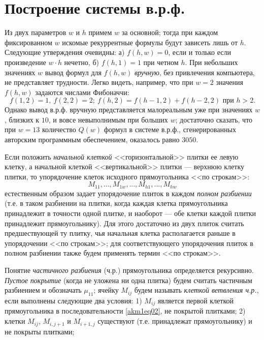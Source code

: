 \section{Построение системы в.р.ф.}

Из двух параметров $w$ и $h$ примем $w$ за основной; тогда при каждом фиксированном $w$ искомые рекуррентные формулы будут зависеть лишь от $h$.
Следующие утверждения очевидны: а) $f(h,w)=0$, если и только если произведение $w\cdot h$ нечетно, б) $f(h,1)=1$ при четном $h$. При небольших значениях $w$ вывод формул для $f(h,w)$ \textit{ вручную}, без привлечения компьютера, не представляет трудности. Легко видеть, например, что при $w=2$ значения $f(h,w)$ задаются числами Фибоначчи:
$$
f(1,2)=1,\ f(2,2)=2;\ f(h,2)=f(h-1,2)+f(h-2,2) \text { при }  h>2.
$$
%
Однако вывод в.р.ф. вручную представляется малореальным уже при значениях $w$, близких к $10$, и вовсе невыполнимым при больших $w$; достаточно сказать, что при ${w=13}$ количество $Q(w)$ формул в системе в.р.ф., сгенерированных авторским программным обеспечением, оказалось равно $3050$.

Если положить \textit{ начальной клеткой} <<горизонтальной>> плитки ее левую клетку, а начальной клеткой <<вертикальной>> плитки --– верхнюю клетку плитки, то упорядочение клеток исходного прямоугольника <<по строкам>>:
\begin{equation}\label{akm1eq02}
M_{11}, ..., M_{1w}, ..., M_{h1},..., M_{hw}
\end{equation}
естественным образом задает упорядочение плиток в каждом \textit{ полном разбиении} (т.е. в таком разбиении на плитки, когда каждая клетка прямоугольника принадлежит в точности одной плитке, и наоборот --- обе клетки каждой плитки принадлежит прямоугольнику). Для этого достаточно из двух плиток считать предшествующей ту плитку, чья начальная клетка располагается раньше в упорядочении <<по строкам>>; для соответствующего упорядочения плиток в полном разбиении также будем применять термин <<по строкам>>.

Понятие \textit{ частичного разбиения} (ч.р.) прямоугольника определяется рекурсивно. \textit{ Пустое покрытие} (когда не уложена ни одна плитка) будем считать частичным разбиением и обозначать $\mu_{11}$;
ячейку $M_{ij}$ будем называть \textit{ клеткой ветвления ч.р.}, если выполнены следующие два условия:
1) $M_{ij}$ является первой клеткой прямоугольника в последовательности \eqref{akm1eq02}, не покрытой плитками; 2) клетки $M_{ij}$, $M_{i,j+1}$  и $M_{i+1,j}$ существуют (т.е. принадлежат прямоугольнику) и не покрыты плитками;

